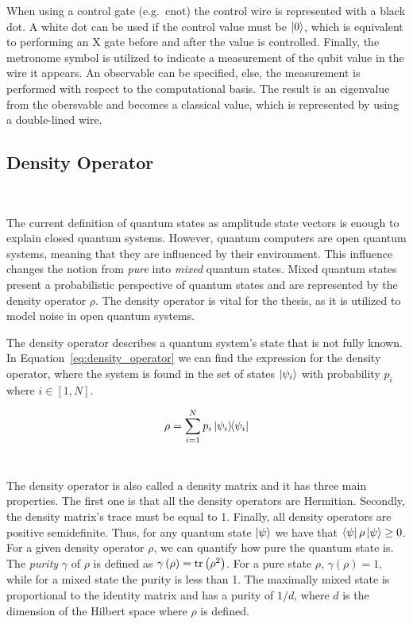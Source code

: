 When using a control gate (e.g.~\ac{cnot}) the control wire is represented
with a black dot. A white dot can be used if the control value must be
\(\ket{0}\), which is equivalent to performing an X gate before and after
the value is controlled. Finally, the metronome symbol is utilized to indicate
a measurement of the qubit value in the wire it appears. An observable can be
specified, else, the measurement is performed with respect to the computational
basis. The result is an eigenvalue from the obersvable and becomes a
classical value, which is represented by using a double-lined wire. \

\subsection{Density Operator}\label{subsection:density_operator} \

The current definition of quantum states as amplitude state vectors is
enough to explain closed quantum systems. However, quantum computers
are open quantum systems, meaning that they are influenced by
their environment. This influence changes the notion from \textit{pure}
into \textit{mixed} quantum states. Mixed quantum states present a
probabilistic perspective of quantum states and are represented by the
density operator \(\rho\). The density operator is vital for the thesis,
as it is utilized to model noise in open quantum systems. \

The density operator describes a quantum system's state that is not
fully known. In Equation~\ref{eq:density_operator} we can find
the expression for the density operator, where the system is found
in the set of states \(\ket{\psi_i}\) with probability \(p_i\) where
\(i \in \left[1,N\right]\). \

\begin{equation}\label{eq:density_operator}
  \rho = \sum_{i=1}^{N}p_i\ketbra{\psi_i}{\psi_i}
\end{equation} \

The density operator is also called a density matrix and it has three main
properties. The first one is that all the density operators are Hermitian.
Secondly, the density matrix's trace must be equal to 1. Finally, all
density operators are positive semidefinite. Thus, for any quantum state
\(\ket{\psi}\) we have that \(\bra{\psi}\rho\ket{\psi} \geq 0\). For a
given density operator \(\rho\), we can quantify how pure the quantum
state is. The \textit{purity} \(\gamma\) of \(\rho\) is defined as 
\(\gamma\left(\rho\right) = \trace\left(\rho^2\right)\). For a pure state \(\rho\),
\(\gamma\left(\rho\right) = 1\), while for a mixed state the purity is less
than 1. The maximally mixed state is proportional to the identity matrix
and has a purity of \(1/d\), where \(d\) is the dimension of the Hilbert
space where \(\rho\) is defined. \


